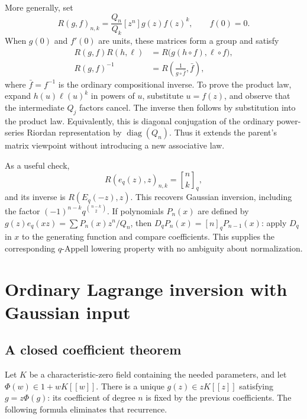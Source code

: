 \documentclass[11pt,a4paper]{article}
\numberwithin{equation}{section}
\theoremstyle{definition}
\theoremstyle{remark}
\newcommand{\G}[2]{\genfrac{[}{]}{0pt}{}{#1}{#2}_{q}}
\newcommand{\qnum}[1]{[#1]_q}
\newcommand{\coef}[2]{[#1^{#2}]}
\newcommand{\Dq}{D_q}
\begin{document}
More generally, set
\begin{equation}
 R(g,f)_{n,k}=\frac{Q_n}{Q_k}\coef zn g(z)f(z)^k,
 \qquad f(0)=0.
 \label{eq:q-riordan}
\end{equation}
When $g(0)$ and $f'(0)$ are units, these matrices form a group and satisfy
\begin{align}
 R(g,f)R(h,\ell)&=R\bigl(g(h\circ f),\ell\circ f\bigr),
 \label{eq:q-riordan-law}\\
 R(g,f)^{-1}&=R\left(\frac1{g\circ\bar f},\bar f\right),
 \label{eq:q-riordan-inverse}
\end{align}
where $\bar f=f^{-1}$ is the ordinary compositional inverse. To prove
the product law, expand $h(u)\ell(u)^k$ in powers of $u$, substitute
$u=f(z)$, and observe that the intermediate $Q_j$ factors cancel.
The inverse then follows by substitution into the product law.
Equivalently, this is diagonal conjugation of the ordinary
power-series Riordan representation by $\operatorname{diag}(Q_n)$.
Thus it extends the parent's matrix viewpoint without introducing a
new associative law.

As a useful check,
\[
 R(e_q(z),z)_{n,k}=\G nk,
\]
and its inverse is $R(E_q(-z),z)$. This recovers Gaussian inversion,
including the factor $(-1)^{n-k}q^{\binom{n-k}2}$.
If polynomials $P_n(x)$ are defined by
$g(z)e_q(xz)=\sum P_n(x)z^n/Q_n$, then
$\Dq P_n(x)=\qnum n P_{n-1}(x)$: apply $\Dq$ in $x$ to the generating
function and compare coefficients. This supplies the corresponding
$q$-Appell lowering property with no ambiguity about normalization.

\section{Ordinary Lagrange inversion with Gaussian input}
\label{sec:lagrange}

\subsection{A closed coefficient theorem}
Let $K$ be a characteristic-zero field containing the needed parameters,
and let $\Phi(w)\in1+wK[[w]]$. There is a unique $g(z)\in zK[[z]]$
satisfying $g=z\Phi(g)$: its coefficient of degree $n$ is fixed by the
previous coefficients. The following formula eliminates that recurrence.
\end{document}
